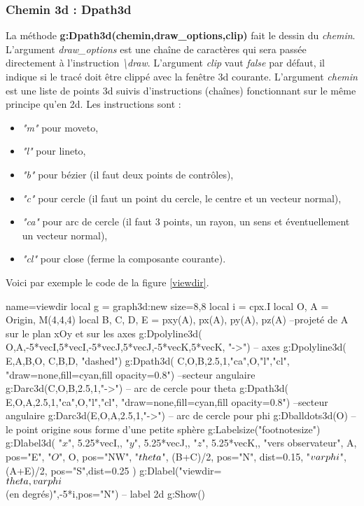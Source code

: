 \subsubsection{Chemin 3d : Dpath3d}

La méthode \textbf{g:Dpath3d(chemin,draw\_options,clip)} fait le dessin du \emph{chemin}. L'argument \emph{draw\_options} est une chaîne de caractères qui sera passée directement à l'instruction \emph{\textbackslash draw}. L'argument \emph{clip} vaut \emph{false} par défaut, il indique si le tracé doit être clippé avec la fenêtre 3d courante. L'argument \emph{chemin} est une liste de points 3d suivis d'instructions (chaînes) fonctionnant sur le même principe qu'en 2d. Les instructions sont :
    \begin{itemize}
      \item \emph{"m"} pour moveto,
      \item \emph{"l"} pour lineto,
      \item \emph{"b"} pour bézier (il faut deux points de contrôles),
      \item \emph{"c"} pour cercle (il faut un point du cercle, le centre et un vecteur normal),
      \item \emph{"ca"} pour arc de cercle (il faut 3 points, un rayon, un sens et éventuellement un vecteur normal),
      \item \emph{"cl"} pour close (ferme la composante courante).
      \end{itemize}

Voici par exemple le code de la figure \ref{viewdir}.

\begin{Luacode}
\begin{luadraw}{name=viewdir}
local g = graph3d:new{ size={8,8} }
local i = cpx.I
local O, A = Origin, M(4,4,4)
local B, C, D, E = pxy(A), px(A), py(A), pz(A) --projeté de A sur le plan xOy et sur les axes
g:Dpolyline3d( {{O,A},{-5*vecI,5*vecI},{-5*vecJ,5*vecJ},{-5*vecK,5*vecK}}, "->") -- axes
g:Dpolyline3d( {{E,A,B,O}, {C,B,D}}, "dashed")
g:Dpath3d( {C,O,B,2.5,1,"ca",O,"l","cl"}, "draw=none,fill=cyan,fill opacity=0.8") --secteur angulaire
g:Darc3d(C,O,B,2.5,1,"->") -- arc de cercle pour theta
g:Dpath3d( {E,O,A,2.5,1,"ca",O,"l","cl"}, "draw=none,fill=cyan,fill opacity=0.8") --secteur angulaire
g:Darc3d(E,O,A,2.5,1,"->") -- arc de cercle pour phi
g:Dballdots3d(O) -- le point origine sous forme d'une petite sphère
g:Labelsize("footnotesize")
g:Dlabel3d(
    "$x$", 5.25*vecI,{}, "$y$", 5.25*vecJ,{}, "$z$", 5.25*vecK,{},
    "vers observateur", A, {pos="E"},
    "$O$", O, {pos="NW"},
    "$\\theta$", (B+C)/2, {pos="N", dist=0.15},
    "$\\varphi$", (A+E)/2, {pos="S",dist=0.25}
)
g:Dlabel("viewdir=\\{$\\theta,\\varphi$\\} (en degrés)",-5*i,{pos="N"}) -- label 2d
g:Show()   
\end{luadraw}      
\end{Luacode}

